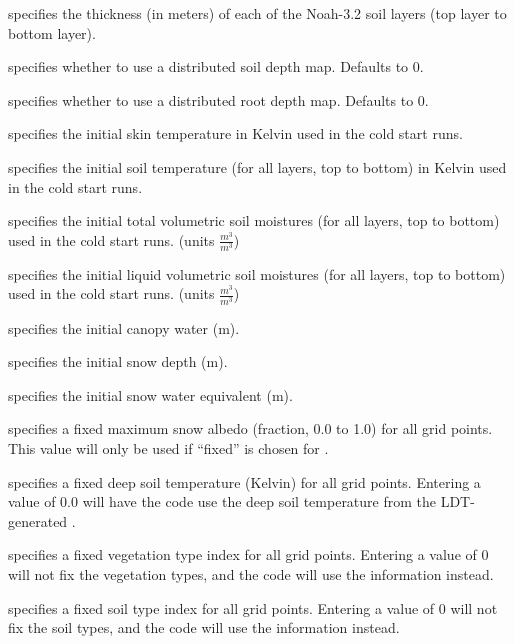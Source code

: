   specifies the thickness (in meters)
 of each of the Noah-3.2 soil layers (top layer to bottom layer).

  specifies whether
 to use a distributed soil depth map. Defaults to 0.

  specifies whether
 to use a distributed root depth map. Defaults to 0.

 specifies the initial skin temperature in Kelvin used in the
 cold start runs.

 specifies the initial soil temperature (for all layers,
 top to bottom) in Kelvin used in the cold start runs.

  specifies the
 initial total volumetric soil moistures (for all layers,
 top to bottom) used in the cold start runs.
 (units $\frac{m^3}{m^3}$)

  specifies the
 initial liquid volumetric soil moistures (for all layers,
 top to bottom) used in the cold start runs.
 (units $\frac{m^3}{m^3}$)

  specifies the initial
 canopy water (m).

  specifies the initial
 snow depth (m).

  specifies the initial
 snow water equivalent (m).

  specifies a fixed maximum
 snow albedo (fraction, 0.0 to 1.0) for all grid points.  This
 value will only be used if ``fixed'' is chosen for
 .

  specifies a fixed
 deep soil temperature (Kelvin) for all grid points.  Entering
 a value of 0.0 will have the code use the deep soil temperature
 from the LDT-generated .

  specifies a fixed
 vegetation type index for all grid points.  Entering a value
 of 0 will not fix the vegetation types, and the code will use
 the  information instead.

  specifies a fixed soil
 type index for all grid points.  Entering a value of 0
 will not fix the soil types, and the code will use the
  information instead.

